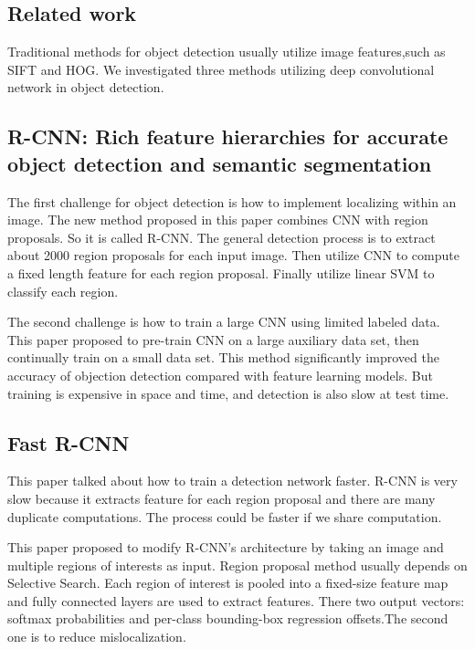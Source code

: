 
\subsection{Related work}
\label{others}
Traditional methods for object detection usually utilize image features,such as SIFT and HOG. We investigated three methods utilizing deep convolutional network in object detection.
\subsection{R-CNN: Rich feature hierarchies for accurate object detection and semantic segmentation}

 The first challenge for object detection is how to implement localizing within an image. The new method proposed in this paper\cite {rcnn} combines CNN with region proposals. So it is called R-CNN. The general detection process is to extract about 2000 region proposals for each input image. Then utilize CNN to compute a fixed length feature for each region proposal. Finally utilize linear SVM to classify each region. 


The second challenge is how to train a large CNN using limited labeled data. This paper proposed to pre-train CNN on a large auxiliary data set, then continually train on a small data set. This method significantly improved the accuracy of objection detection compared with feature learning models. But training is expensive in space and time, and detection is also slow at test time.

\subsection{Fast R-CNN}
This paper\cite {fast-rcnn} talked about how to train a detection network faster. R-CNN is very slow because it extracts feature for each region proposal and there are many duplicate computations. The process could be faster if we share computation. 

This paper proposed to modify R-CNN’s architecture by taking an image and multiple regions of interests as input. Region proposal method usually depends on Selective Search. Each region of interest is pooled into a fixed-size feature map and fully connected layers are used to extract features. There two output vectors: softmax probabilities and per-class bounding-box regression offsets.The second one is to reduce mislocalization.




